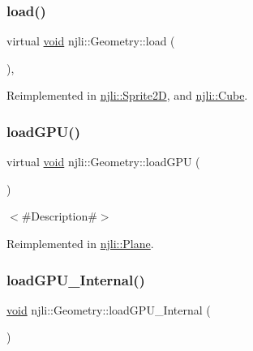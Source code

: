 \subsubsection{\texorpdfstring{load()}{load()}\hspace{0.1cm}{\footnotesize\ttfamily [2/2]}}
{\footnotesize\ttfamily virtual \mbox{\hyperlink{_thread_8h_af1e856da2e658414cb2456cb6f7ebc66}{void}} njli\+::\+Geometry\+::load (\begin{DoxyParamCaption}{ }\end{DoxyParamCaption})\hspace{0.3cm}{\ttfamily [protected]}, {\ttfamily [virtual]}}



Reimplemented in \mbox{\hyperlink{classnjli_1_1_sprite2_d_afe5dc58f98c20568da4bb48cc2ade19f}{njli\+::\+Sprite2D}}, and \mbox{\hyperlink{classnjli_1_1_cube_ac4040d5afd8034ba6cafca66d472c966}{njli\+::\+Cube}}.

\mbox{\label{classnjli_1_1_geometry_a3242e657cbb5914f8f29ba6dbe21ef89}} 
\subsubsection{\texorpdfstring{load\+G\+P\+U()}{loadGPU()}}
{\footnotesize\ttfamily virtual \mbox{\hyperlink{_thread_8h_af1e856da2e658414cb2456cb6f7ebc66}{void}} njli\+::\+Geometry\+::load\+G\+PU (\begin{DoxyParamCaption}{ }\end{DoxyParamCaption})\hspace{0.3cm}{\ttfamily [virtual]}}

$<$\#\+Description\#$>$ 

Reimplemented in \mbox{\hyperlink{classnjli_1_1_plane_ad52d21698d5e389af343d798b985bc67}{njli\+::\+Plane}}.

\mbox{\label{classnjli_1_1_geometry_a0c5aad85ac6ab14068c229abb87e2c17}} 
\subsubsection{\texorpdfstring{load\+G\+P\+U\+\_\+\+Internal()}{loadGPU\_Internal()}}
{\footnotesize\ttfamily \mbox{\hyperlink{_thread_8h_af1e856da2e658414cb2456cb6f7ebc66}{void}} njli\+::\+Geometry\+::load\+G\+P\+U\+\_\+\+Internal (\begin{DoxyParamCaption}{ }\end{DoxyParamCaption})\hspace{0.3cm}{\ttfamily [private]}}

